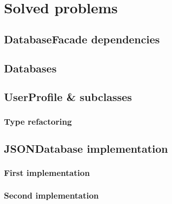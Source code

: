 \section{Solved problems}
\subsection{DatabaseFacade dependencies}

\subsection{Databases}

\subsection{UserProfile \& subclasses}

\subsubsection{Type refactoring}

\subsection{JSONDatabase implementation}

\subsubsection{First implementation}

\subsubsection{Second implementation}

\newpage
